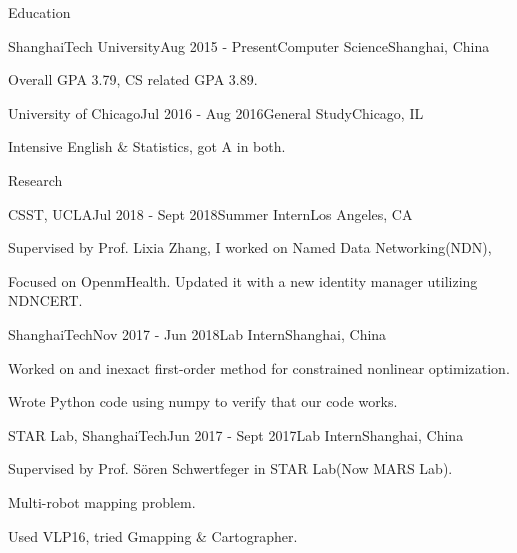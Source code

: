 \documentclass{resume} %
\begin{document}

\begin{rSection}{Education}

\begin{rSubsection}
  {ShanghaiTech University}{Aug 2015 - Present}{Computer Science}{Shanghai, China}
    \item Overall GPA 3.79, CS related GPA 3.89.
\end{rSubsection}


\begin{rSubsection}
  {University of Chicago}{Jul 2016 - Aug 2016}{General Study}{Chicago, IL}
    \item Intensive English \& Statistics, got A in both.
\end{rSubsection}
\end{rSection}

\begin{rSection}{Research}

\begin{rSubsection}
  {CSST, UCLA}{Jul 2018 - Sept 2018}{Summer Intern}{Los Angeles, CA}
    \item Supervised by Prof. Lixia Zhang, I worked on Named Data Networking(NDN), 
    \item Focused on OpenmHealth. Updated it with a new identity manager utilizing NDNCERT.
\end{rSubsection}


\begin{rSubsection}
  {ShanghaiTech}{Nov 2017 - Jun 2018}{Lab Intern}{Shanghai, China}
    \item Worked on and inexact first-order method for constrained nonlinear optimization.
    \item Wrote Python code using numpy to verify that our code works.
\end{rSubsection}


\begin{rSubsection}
  {STAR Lab, ShanghaiTech}{Jun 2017 - Sept 2017}{Lab Intern}{Shanghai, China}
    \item Supervised by Prof. Sören Schwertfeger in STAR Lab(Now MARS Lab).
    \item Multi-robot mapping problem.
    \item Used VLP16, tried Gmapping \& Cartographer.
\end{rSubsection}

\end{rSection}
\end{document}
